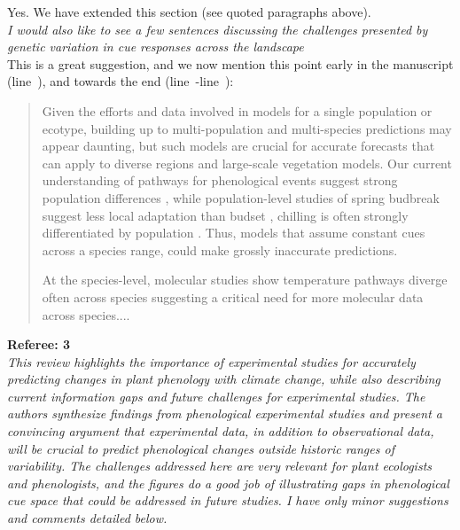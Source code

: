 \documentclass[11pt,letter]{article}
\newcommand{\lr}[1]{line~\lineref{#1}}
\begin{document}
Yes. We have extended this section (see quoted paragraphs above).\\

\emph{I would also like to see a few sentences discussing the challenges presented by genetic variation in cue responses across the landscape }\\

This is a great suggestion, and we now mention this point early in the manuscript (\lr{molecpop}), and towards the end (\lr{r2popstart}-\lr{r2popsend}):
\begin{quote}
Given the efforts and data involved in models for a single population or ecotype, building up to multi-population and multi-species predictions may appear daunting, but such models are crucial for accurate forecasts that can apply to diverse regions and large-scale vegetation models. Our current understanding of pathways for phenological events suggest strong population differences \citep{Wilczek:2009oa,Tanino2010}, while population-level studies of spring budbreak suggest less local adaptation than budset \citep{Aitken:2008}, chilling is often strongly differentiated by population \citep{Junttila:2012aa}. Thus, models that assume constant cues across a species range, could make grossly inaccurate predictions.

At the species-level, molecular studies show temperature pathways diverge often across species \citep[on contrast, photoperiodic control appears highly conserved,][]{Satake2022} suggesting a critical need for more molecular data across species....
\end{quote}

{\bf Referee: 3}\\

\emph{This review highlights the importance of experimental studies for accurately predicting changes in plant phenology with climate change, while also describing current information gaps and future challenges for experimental studies.  The authors synthesize findings from phenological experimental studies and present a convincing argument that experimental data, in addition to observational data, will be crucial to predict phenological changes outside historic ranges of variability. The challenges addressed here are very relevant for plant ecologists and phenologists, and the figures do a good job of illustrating gaps in phenological cue space that could be addressed in future studies. I have only minor suggestions and comments detailed below. }\\
\end{document}
